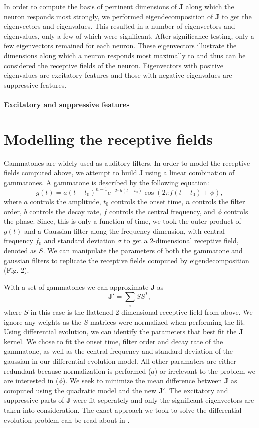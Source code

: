 \documentclass{article}
\begin{document}
In order to compute the basis of pertinent dimensions of $\mathbf{J}$ along which the neuron responds most strongly, we performed eigendecomposition of $\mathbf{J}$ to get the eigenvectors and eigenvalues. This resulted in a number of eigenvectors and eigenvalues, only a few of which were significant. %
After significance testing, only a few eigenvectors remained for each neuron. These eigenvectors illustrate the dimensions along which a neuron responds most maximally to and thus can be considered the receptive fields of the neuron. Eigenvectors with positive eigenvalues are excitatory features and those with negative eigenvalues are suppressive features. 

\paragraph{Excitatory and suppressive features}


\section{Modelling the receptive fields}

Gammatones are widely used as auditory filters. In order to model the receptive fields computed above, we attempt to build J using a linear combination of gammatones. A gammatone is described by the following equation:$$g(t) = a(t-t_0)^{n-1}e^{-2\pi b(t-t_0)}\cos({2\pi f (t-t_0) + \phi}),
$$ where $a$ controls the amplitude, $t_0$ controls the onset time, $n$ controls the filter order, $b$ controls the decay rate, $f$ controls the central frequency, and $\phi$ controls the phase. Since, this is only a function of time, we took the outer product of $g(t)$ and a Gaussian filter along the frequency dimension, with central frequency $f_0$ and standard deviation $\sigma$ to get a 2-dimensional receptive field, denoted as $S$. We can manipulate the parameters of both the gammatone and gaussian filters to replicate the receptive fields computed by eigendecomposition (Fig. 2). 

With a set of gammatones we can approximate $\mathbf{J}$ as $$\mathbf{J'} = \sum_{i}{SS^T},$$  where $S$ in this case is the flattened 2-dimensional receptive field from above. We ignore any weights as the $S$ matrices were normalized when performing the fit. Using differential evolution, we can identify the parameters that best fit the $\mathbf{J}$ kernel. We chose to fit the onset time, filter order and decay rate of the gammatone, as well as the central frequency and standard deviation of the gaussian in our differential evolution model. All other paramaters are either redundant because normalization is performed ($a$) or irrelevant to the problem we are interested in ($\phi$). We seek to minimize the mean difference between $\mathbf{J}$ as computed using the quadratic model and the new $\mathbf{J'}$. The excitatory and suppressive parts of $\mathbf{J}$ were fit seperately and only the significant eigenvectors are taken into consideration. The exact approach we took to solve the differential evolution problem can be read about in \cite{rowekamp2017cross}.
\end{document}
